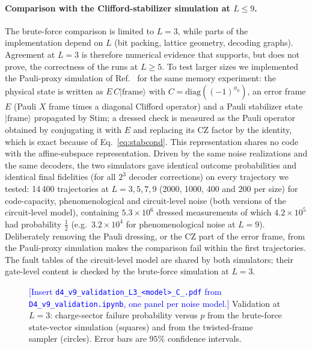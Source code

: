 \documentclass[a4paper]{article}
\newcommand{\blue}[1]{\textcolor{blue}{#1}}
\providecommand{\ket}[1]{\ensuremath{|#1\rangle}}
\begin{document}
\paragraph{Comparison with the Clifford-stabilizer simulation at $L\le9$.}
The brute-force comparison is limited to $L=3$, while parts of the implementation depend on $L$ (bit packing, lattice geometry, decoding graphs). Agreement at $L=3$ is therefore numerical evidence that supports, but does not prove, the correctness of the runs at $L\ge5$. To test larger sizes we implemented the Pauli-proxy simulation of Ref.~\cite{takada2026exact} for the same memory experiment: the physical state is written as $E\,C\ket{\mathrm{frame}}$ with $C=\mathrm{diag}((-1)^{\phi_0})$, an error frame $E$ (Pauli $X$ frame times a diagonal Clifford operator) and a Pauli stabilizer state $\ket{\mathrm{frame}}$ propagated by Stim; a dressed check is measured as the Pauli operator obtained by conjugating it with $E$ and replacing its CZ factor by the identity, which is exact because of Eq.~\eqref{eq:stabcond}. This representation shares no code with the affine-subspace representation. Driven by the same noise realizations and the same decoders, the two simulators gave identical outcome probabilities and identical final fidelities (for all $2^3$ decoder corrections) on every trajectory we tested: 14\,400 trajectories at $L=3,5,7,9$ (2000, 1000, 400 and 200 per size) for code-capacity, phenomenological and circuit-level noise (both versions of the circuit-level model), containing $5.3\times10^6$ dressed measurements of which $4.2\times10^5$ had probability $\tfrac12$ (e.g.\ $3.2\times10^4$ for phenomenological noise at $L=9$). Deliberately removing the Pauli dressing, or the CZ part of the error frame, from the Pauli-proxy simulation makes the comparison fail within the first trajectories. The fault tables of the circuit-level model are shared by both simulators; their gate-level content is checked by the brute-force simulation at $L=3$.

\begin{figure}[t]
  \centering
  \fbox{\rule{0pt}{50mm}\rule{0.82\linewidth}{0pt}}
  \caption{\blue{[Insert \texttt{d4\_v9\_validation\_L3\_<model>\_C\_<r|rgb>.pdf} from \texttt{D4\_v9\_validation.ipynb}, one panel per noise model.]} Validation at $L=3$: charge-sector failure probability versus $p$ from the brute-force state-vector simulation (squares) and from the twisted-frame sampler (circles). Error bars are $95\%$ confidence intervals.}
  \label{fig:validation}
\end{figure}
\end{document}
